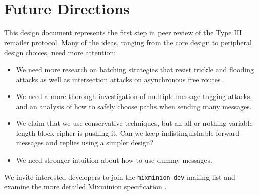 \documentclass[11pt]{IEEEtran}
\begin{document}

\section{Future Directions}
\label{sec:conclusion}

This design document represents the first step in peer review of the
Type III remailer protocol. Many of the ideas, ranging from the core
design to peripheral design choices, need more attention:

\begin{itemize}
\item We need more research on batching strategies that resist trickle
and flooding attacks \cite{batching-taxonomy} as well as intersection
attacks on asynchronous free routes \cite{disad-free-routes}.
\item We need a more thorough investigation of multiple-message tagging
attacks, and an analysis of how to safely choose paths when
sending many messages.
\item We claim that we use conservative techniques, but an all-or-nothing
variable-length block cipher is pushing it. Can we keep indistinguishable
forward messages and replies using a simpler design?
\item We need stronger intuition about how to use
dummy messages.
\end{itemize}

We invite interested developers to join the {\tt mixminion-dev}
mailing list \cite{mixminion-dev} and examine the more detailed Mixminion
specification \cite{mixminion-spec}.







\end{document}
